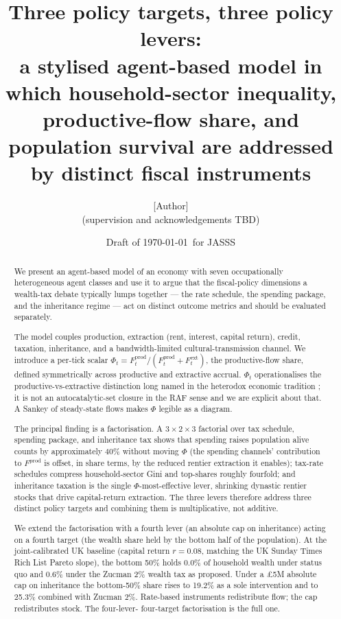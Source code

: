 \documentclass[11pt]{article}
\title{Three policy targets, three policy levers:\\
\large a stylised agent-based model in which household-sector
inequality, productive-flow share, and population survival are
addressed by distinct fiscal instruments}
\author{[Author]\\
\small (supervision and acknowledgements TBD)}
\date{Draft of \today\ for JASSS}
\begin{document}
\maketitle

\begin{abstract}
We present an agent-based model of an economy with seven occupationally
heterogeneous agent classes and use it to argue that the fiscal-policy
dimensions a wealth-tax debate typically lumps together --- the rate
schedule, the spending package, and the inheritance regime --- act on
distinct outcome metrics and should be evaluated separately.

The model couples production, extraction (rent, interest, capital
return), credit, taxation, inheritance, and a bandwidth-limited
cultural-transmission channel.  We introduce a per-tick scalar
$\Phi_t = F^\text{prod}_t / (F^\text{prod}_t + F^\text{ext}_t)$, the
productive-flow share, defined symmetrically across productive and
extractive accrual.  $\Phi_t$ operationalises the
productive-vs-extractive distinction long named in the heterodox
economic tradition \citep{kauffman1988evolution, mazzucato2018value};
it is not an autocatalytic-set closure in the
\citet{hordijk2004detecting} RAF sense and we are explicit about that.
A Sankey of steady-state flows makes $\Phi$ legible as a diagram.

The principal finding is a factorisation.  A $3 \times 2 \times 3$
factorial over tax schedule, spending package, and inheritance tax
shows that spending raises population alive counts by approximately
40\% without moving $\Phi$ (the spending channels' contribution to
$F^\text{prod}$ is offset, in share terms, by the reduced rentier
extraction it enables); tax-rate schedules compress household-sector
Gini and top-shares roughly fourfold; and inheritance taxation is the
single $\Phi$-most-effective lever, shrinking dynastic rentier stocks
that drive capital-return extraction.  The three levers therefore
address three distinct policy targets and combining them is
multiplicative, not additive.

We extend the factorisation with a fourth lever (an absolute cap
on inheritance) acting on a fourth target (the wealth share held
by the bottom half of the population).  At the joint-calibrated UK
baseline (capital return $r = 0.08$, matching the UK Sunday Times
Rich List Pareto slope), the bottom 50\% holds 0.0\% of household
wealth under status quo and 0.6\% under the Zucman 2\% wealth tax
as proposed.  Under a \pounds 5M absolute cap on inheritance the
bottom-50\% share rises to 19.2\% as a sole intervention and to
25.3\% combined with Zucman 2\%.  Rate-based instruments
redistribute flow; the cap redistributes stock.  The four-lever-
four-target factorisation is the full one.


\end{abstract}
\end{document}
